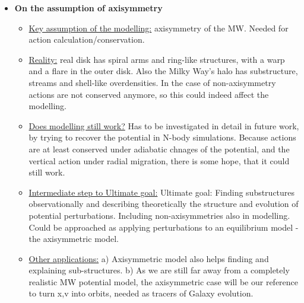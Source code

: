\begin{itemize}
\item \textbf{On the assumption of axisymmetry} 
\begin{itemize}
\item \underline{Key assumption of the modelling:} axisymmetry of the MW. Needed for action calculation/conservation.
\item \underline{Reality:}  real disk has spiral arms and ring-like structures, with a warp and a flare in the outer disk. Also the Milky Way's halo has substructure, streams and shell-like overdensities. In the case of non-axisymmetry actions are not conserved anymore, so this could indeed affect the modelling.
\item \underline{Does modelling still work?} Has to be investigated in detail in future work, by trying to recover the potential in N-body simulations. Because actions are at least conserved under adiabatic chnages of the potential, and the vertical action under radial migration, there is some hope, that it could still work.
\item \underline{Intermediate step to Ultimate goal:} Ultimate goal: Finding substructures observationally and describing theoretically the structure and evolution of potential perturbations. Including non-axisymmetries also in modelling. Could be approached as applying perturbations to an equilibrium model - the axisymmetric model. 
\item \underline{Other applications:} a) Axisymmetric model also helps finding and explaining sub-structures.  b) As we are still far away from a completely realistic MW potential model, the axisymmetric case will be our reference to turn x,v into orbits, needed as tracers of Galaxy evolution.
\end{itemize}


\end{itemize}
